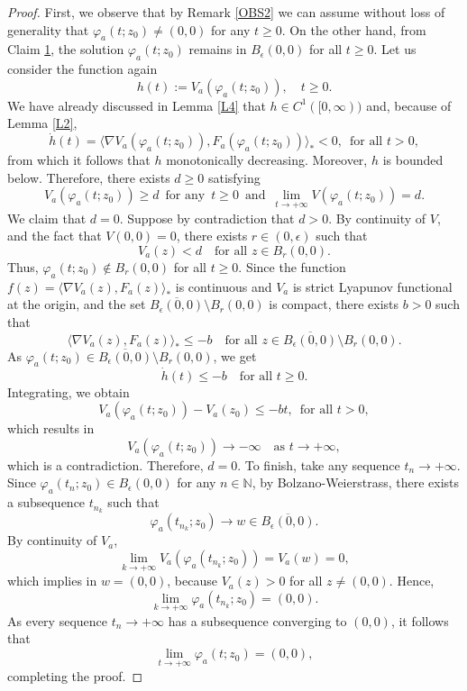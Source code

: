 \documentclass[12pt]{amsart}
\numberwithin{equation}{section}
\begin{document}
\begin{proof}
First, we observe that by Remark \ref{OBS2} we can assume without loss of generality that $\varphi_a(t;z_0) \neq (0,0)$ for any $t\ge 0$. On the other hand, from Claim \hyperlink{C1}{1}, the solution $\varphi_a(t;z_0)$ remains in $B_\epsilon(0,0)$ for all $t \geq 0$. Let us consider the function again
$$
h(t) := V_a(\varphi_a(t;z_0)), \quad t \geq 0.
$$
We have already discussed in Lemma \ref{L4} that $h \in C^1([0, \infty))$ and, because of Lemma \ref{L2}, 
$$
\dot{h}(t) = \langle \nabla V_a(\varphi_a(t;z_0)), F_a(\varphi_a(t;z_0)) \rangle_* < 0, \, \text{ for all }t > 0,
$$
from which it follows that $h$ monotonically decreasing. Moreover, $h$ is bounded below. Therefore, there exists $d \geq 0$ satisfying
$$
V_a(\varphi_a(t;z_0))\ge d \, \text{ for any }\, t\ge 0\, \text{ and }\, \lim_{t \to +\infty} V(\varphi_a(t;z_0)) = d.
$$
We claim that $d = 0$. Suppose by contradiction that $d > 0$. By continuity of $V$, and the fact that $V(0,0) = 0$, there exists $r \in (0, \epsilon)$ such that
$$
V_a(z) < d \quad \text{for all } z \in B_r(0,0).
$$
Thus, $\varphi_a(t;z_0) \notin B_r(0,0)$ for all $t \geq 0$. Since the function $f(z) = \langle \nabla V_a(z), F_a(z) \rangle_*$ is continuous and $V_a$ is strict Lyapunov functional at the origin, and the set $\overline{B_\epsilon(0,0)} \setminus B_r(0,0)$ is compact, there exists $b > 0$ such that
$$
\langle \nabla V_a(z), F_a(z) \rangle_* \leq -b \quad \text{for all } z \in \overline{B_\epsilon(0,0)} \setminus B_r(0,0).
$$
As $\varphi_a(t;z_0) \in \overline{B_\epsilon(0,0)} \setminus B_r(0,0)$, we get
$$
\dot{h}(t) \leq -b \quad \text{for all } t \geq 0.
$$
Integrating, we obtain
$$
V_a(\varphi_a(t;z_0)) - V_a(z_0) \leq -bt,\, \text{ for all }t>0,
$$
which results in
$$
V_a(\varphi_a(t;z_0)) \to -\infty \quad \text{as } t \to +\infty,
$$
which is a contradiction. Therefore, $d = 0$. To finish, take any sequence $t_n \to +\infty$. Since $\varphi_a(t_n;z_0) \in B_\epsilon(0,0)$ for any $n\in\mathbb{N}$, by Bolzano-Weierstrass, there exists a subsequence $t_{n_k}$ such that
$$
\varphi_a(t_{n_k};z_0) \to w \in \overline{B_\epsilon(0,0)}.
$$
By continuity of $V_a$,
$$
\lim_{k \to +\infty} V_a(\varphi_a(t_{n_k};z_0)) = V_a(w) = 0,
$$
which implies in $w = (0,0)$, because $V_a(z) > 0$ for all $z \neq (0,0)$. Hence,
$$
\lim_{k \to+ \infty} \varphi_a(t_{n_k};z_0) = (0,0).
$$
As every sequence $t_n \to +\infty$ has a subsequence converging to $(0,0)$, it follows that
$$
\lim_{t \to +\infty} \varphi_a(t;z_0) = (0,0),
$$
completing the proof.
\end{proof}
\end{document}
